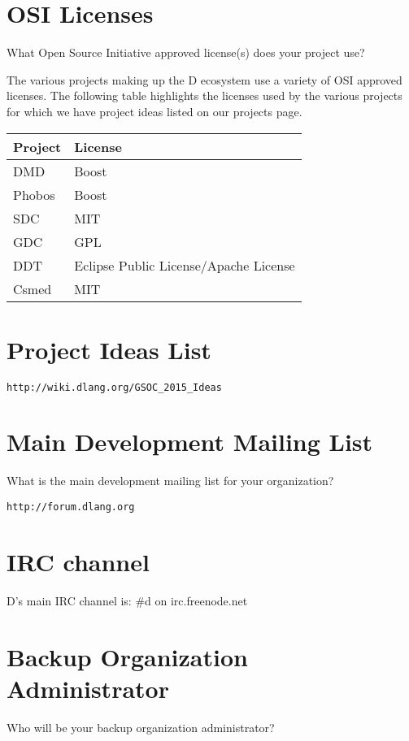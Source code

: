 \documentclass[a4paper,12pt]{article}
\begin{document}
\section{OSI Licenses}

What Open Source Initiative approved license(s) does your project use?

The various projects making up the D ecosystem use a variety of OSI approved
licenses.  The following table highlights the licenses used by the various projects
for which we have project ideas listed on our projects page.

\begin{center}
   \begin{tabular}{ | l | l | }
     \hline
     \textbf{Project} & \textbf{License} \\ \hline
     DMD & Boost \\
     Phobos & Boost \\
     SDC & MIT \\
     GDC & GPL \\
     DDT & Eclipse Public License/Apache License  \\
     Csmed & MIT \\ \hline
   \end{tabular}
\end{center}


\section{Project Ideas List}

\texttt{http://wiki.dlang.org/GSOC\_2015\_Ideas}

\section{Main Development Mailing List}
What is the main development mailing list for your organization?

\texttt{http://forum.dlang.org}

\section{IRC channel}
D's main IRC channel is:  \#d on irc.freenode.net

\section{Backup Organization Administrator}
Who will be your backup organization administrator?
\end{document}
